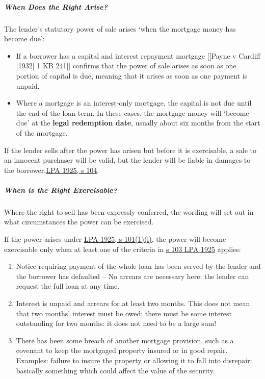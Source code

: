 \documentclass[
]{article}
\providecommand{\tightlist}{%
  \setlength{\itemsep}{0pt}\setlength{\parskip}{0pt}}
\begin{document}
\hypertarget{when-does-the-right-arise}{%
\subparagraph{When Does the Right
Arise?}\label{when-does-the-right-arise}}

The lender's statutory power of sale arises `when the mortgage money has
become due':

\begin{itemize}
\tightlist
\item
  If a borrower has a capital and interest repayment mortgage
  {[}{[}Payne v Cardiff {[}1932{]} 1 KB 241{]}{]} confirms that the
  power of sale arises as soon as one portion of capital is due, meaning
  that it arises as soon as one payment is unpaid.
\item
  Where a mortgage is an interest-only mortgage, the capital is not due
  until the end of the loan term. In these cases, the mortgage money
  will `become due' at the \textbf{legal redemption date}, usually about
  six months from the start of the mortgage.
\end{itemize}

If the lender sells after the power has arisen but before it is
exercisable, a sale to an innocent purchaser will be valid, but the
lender will be liable in damages to the
borrower,\href{https://www.legislation.gov.uk/ukpga/Geo5/15-16/20/section/104}{LPA
1925, s 104}.

\hypertarget{when-is-the-right-exercisable}{%
\subparagraph{When is the Right
Exercisable?}\label{when-is-the-right-exercisable}}

Where the right to sell has been expressly conferred, the wording will
set out in what circumstances the power can be exercised.

If the power arises under
\href{https://www.legislation.gov.uk/ukpga/Geo5/15-16/20/section/101}{LPA
1925, s 101(1)(i)}, the power will become exercisable only when at least
one of the criteria in
\href{https://www.legislation.gov.uk/ukpga/Geo5/15-16/20/section/103}{s
103 LPA 1925} applies:

\begin{enumerate}
\def\labelenumi{\arabic{enumi}.}
\tightlist
\item
  Notice requiring payment of the whole loan has been served by the
  lender and the borrower has defaulted -- No arrears are necessary
  here: the lender can request the full loan at any time.
\item
  Interest is unpaid and arrears for at least two months. This does not
  mean that two months' interest must be owed: there must be some
  interest outstanding for two months: it does not need to be a large
  sum!
\item
  There has been some breach of another mortgage provision, such as a
  covenant to keep the mortgaged property insured or in good repair.
  Examples: failure to insure the property or allowing it to fall into
  disrepair: basically something which could affect the value of the
  security.
\end{enumerate}
\end{document}
